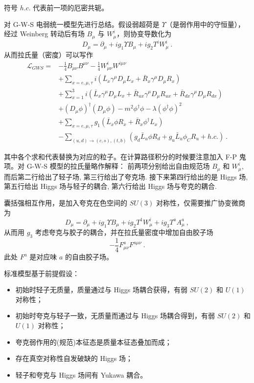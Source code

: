 
\begin{issues}
\issueMissDepend
\issueAbstract
\end{issues}

符号 $h.c.$ 代表前一项的厄密共轭。

对 G-W-S 电弱统一模型先进行总结。假设弱超荷是 $\Upsilon$（是弱作用中的守恒量），经过 Weinberg 转动后有场 $B_\mu$ 与 $W^i_\mu$，则协变导数化为 
\begin{equation}
D_\mu = \partial_\mu + i g_1 \Upsilon B_\mu + i g_2 T^i W_\mu^i~.
\end{equation}
从而拉氏量（密度）可以写作 
\begin{equation}
	\begin{aligned}
		\mathcal L_{GWS} =& -\frac{1}{4} B_{\mu\nu} B^{\mu\nu} - \frac{1}{4} W_{\mu\nu}^i W^{i\mu\nu}\\
		&+ \sum_{x = e, \mu, \tau} i \left(\bar{L}_x \gamma^\mu D_\mu L_x + \bar{R}_x \gamma^\mu D_\mu R_x\right)\\
		&+ \sum_{x=1}^3 i \left(\bar{L}_{x} \gamma^\mu D_\mu L_x + \bar{R}_{ux} \gamma^\mu D_\mu R_{ux} + \bar{R}_{dx} \gamma^\mu D_\mu R_{dx}\right) \\
		&+(D_\mu \phi)^\dagger (D_\mu \phi) - m^2 \phi^\dagger \phi - \lambda (\phi^\dagger \phi)^2 \\
		&+ \sum_{x = e, \mu, \tau} g_1 \left(\bar{L}_x \phi R_x + \bar{R}_x \phi^\dagger L_x\right) \\
		&- \sum_{(u, d) \to (c, s), (t, b)} \left(g_d \bar{L}_u \phi R_d + g_u \bar{L}_u \phi_C R_u + h.c.\right) ~.
	\end{aligned}
\end{equation}

其中各个求和代表替换为对应的粒子。在计算路径积分的时候要注意加入 F-P 鬼项。对 G-W-S 模型的拉氏量略作解释：
前两项分别给出自由规范场 $B_\mu$ 和 $W_\mu^i$, 而后第二行给出了轻子场, 第三行给出了夸克场.
接下来第四行给出的是 Higgs 场, 第五行给出 Higgs 场与轻子的耦合, 第六行给出 Higgs 场与夸克的耦合.

囊括强相互作用，是加入夸克在色空间的 $SU(3)$ 对称性，仅需要推广协变微商为 
\begin{equation}
	D_\mu = \partial_\mu + i g_1 \Upsilon B_\mu + i g_2 T^1 W_\mu^i + i g_3 T^a A^a_\mu ~,
\end{equation}
从而用 $g_3$ 考虑夸克与胶子的耦合，并在拉氏量密度中增加自由胶子场
\begin{equation}
	-\frac14 F_{\mu\nu}^a F^{a\mu\nu} ~.
\end{equation}
此处 $F^a$ 是对应味 $a$ 的自由胶子场。

标准模型基于前提假设：
\begin{itemize}
	\item 初始时轻子无质量，质量通过与 Higgs 场耦合获得，有弱 $SU(2)$ 和 $U(1)$ 对称性；
	\item 初始时夸克与轻子一致，无质量而通过与 Higgs 场耦合得到，有弱 $SU(2)$ 和 $U(1)$ 对称性；
	\item 夸克弱作用的(规范)本征态是质量本征态叠加而成；
	\item 存在真空对称性自发破缺的 Higgs 场；
	\item 轻子和夸克与 Higgs 场间有 Yukawa 耦合。
\end{itemize}
